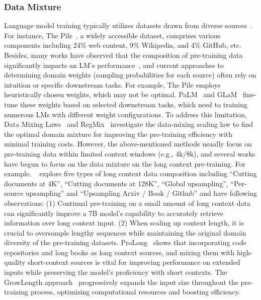 \documentclass[11pt, a4paper, logo, copyright, nonumbering]{map}
\begin{document}
\subsubsection{Data Mixture}
Language model training typically utilizes datasets drawn from diverse sources~\citep{10.5555/3495724.3495883,10.5555/3648699.3648939,Du2021GLaMES,Gao2020ThePA,gao2024prolong}. For instance, The Pile~\citep{Gao2020ThePA}, a widely accessible dataset, comprises various components including 24\% web content, 9\% Wikipedia, and 4\% GitHub, etc.
Besides, many works have observed that 
the composition of pre-training data significantly impacts an LM's performance~\citep{Du2021GLaMES,hoffmann2022an}, 
and current approaches to determining domain weights (sampling probabilities for each source) often rely on intuition or specific downstream tasks. For example, The Pile employs heuristically chosen weights, which may not be optimal. 
PaLM~\citep{10.5555/3648699.3648939} and GLaM~\citep{Du2021GLaMES} fine-tune these weights based on selected downstream tasks, which need to training numerous LMs with different weight configurations.
To address this limitation, 
Data Mixing Laws~\citep{ye2024data} and RegMix~\citep{liu2024regmix} investigate the data-mixing scaling law to find the optimal domain mixture for improving the pre-training efficiency with minimal training costs.
However, the above-mentioned methods usually focus on pre-training data within limited context windows (e.g., 4k/8k),
and several works  have begun to focus on the data mixture on the long context pre-training.
For example,
~\citep{Fu2024DataEF} explore five types of long context data composition including ``Cutting documents at 4K'',  ``{Cutting documents at 128K}'', ``Global upsampling'', ``Per-source upsampling'' and ``Upsampling Arxiv / Book / Github'' and have following observations:
(1) Continual pre-training on a small amount of long context data can significantly improve a 7B model's capability 
 to accurately retrieve information over long context input. 
(2) When scaling up context length, it is crucial to oversample lengthy sequences while maintaining the original domain diversity of the pre-training datasets.
ProLong~\citep{gao2024prolong}
shows that incorporating code repositories and long books as long context sources, and mixing them with high-quality short-context sources is vital for improving performance on extended inputs while preserving the model's proficiency with short contexts.
The GrowLength approach~\citep{growlength} progressively expands the input size throughout the pre-training process, optimizing computational resources and boosting efficiency. 
\end{document}
